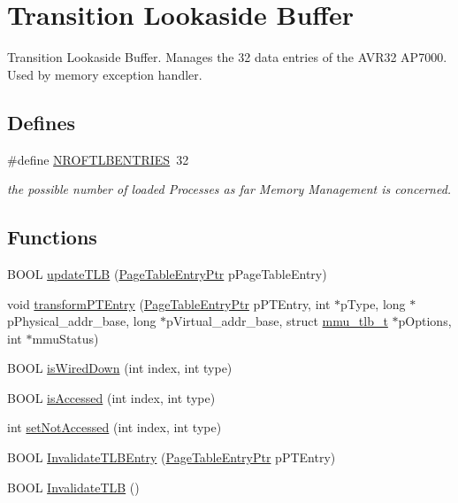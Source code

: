 \hypertarget{group___v_m_m___t_l_b}{
\section{Transition Lookaside Buffer}
\label{group___v_m_m___t_l_b}
}
Transition Lookaside Buffer. Manages the 32 data entries of the AVR32 AP7000. Used by memory exception handler.  


\subsection*{Defines}
\begin{CompactItemize}
\item 
\hypertarget{group___v_m_m___t_l_b_gec877369e5e9d5e6e8d6e84089157684}{
\#define \hyperlink{group___v_m_m___t_l_b_gec877369e5e9d5e6e8d6e84089157684}{NROFTLBENTRIES}~32}
\label{group___v_m_m___t_l_b_gec877369e5e9d5e6e8d6e84089157684}

\begin{CompactList}\small\item\em the possible number of loaded Processes as far Memory Management is concerned. \item\end{CompactList}\end{CompactItemize}
\subsection*{Functions}
\begin{CompactItemize}
\item 
BOOL \hyperlink{group___v_m_m___t_l_b_g769f3784ad4e3826035640f257947a48}{updateTLB} (\hyperlink{struct_page_table_entry}{PageTableEntryPtr} pPageTableEntry)
\item 
void \hyperlink{group___v_m_m___t_l_b_gfc514c7439830f42ce18cb81ac95d4db}{transformPTEntry} (\hyperlink{struct_page_table_entry}{PageTableEntryPtr} pPTEntry, int $\ast$pType, long $\ast$pPhysical\_\-addr\_\-base, long $\ast$pVirtual\_\-addr\_\-base, struct \hyperlink{structmmu__tlb__t}{mmu\_\-tlb\_\-t} $\ast$pOptions, int $\ast$mmuStatus)
\item 
BOOL \hyperlink{group___v_m_m___t_l_b_g394e8e5ef0f91baf7ee2e6ffbb41a632}{isWiredDown} (int index, int type)
\item 
BOOL \hyperlink{group___v_m_m___t_l_b_gec5186e1f24ab3de57765267723dfba6}{isAccessed} (int index, int type)
\item 
int \hyperlink{group___v_m_m___t_l_b_g2cd5a0e8e26579c35da589d5a35a3567}{setNotAccessed} (int index, int type)
\item 
BOOL \hyperlink{group___v_m_m___t_l_b_g0aef1a11aac9970e992625e68280cad0}{InvalidateTLBEntry} (\hyperlink{struct_page_table_entry}{PageTableEntryPtr} pPTEntry)
\item 
BOOL \hyperlink{group___v_m_m___t_l_b_g89da6e0c2dad7972fda18e737fb06a84}{InvalidateTLB} ()
\end{CompactItemize}



